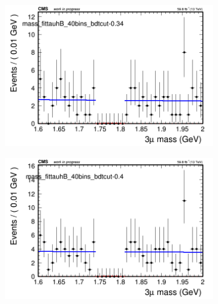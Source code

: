 \begin{figure}[H]
\begin{subfigure}{0.2\textwidth}
        \caption{}
    \end{subfigure}
    \begin{subfigure}{0.2\textwidth}
        \includegraphics[width=\textwidth]{unfixed_exp/plots/tauhB/massfit_tauhB_40bins_bdtcut-0.34.png}
        \caption{}
    \end{subfigure}
    \begin{subfigure}{0.2\textwidth}
        \includegraphics[width=\textwidth]{unfixed_exp/plots/tauhB/massfit_tauhB_40bins_bdtcut-0.4.png}
        \caption{}
    \end{subfigure}
    \begin{subfigure}{0.2\textwidth}

\end{subfigure}
\end{figure}
